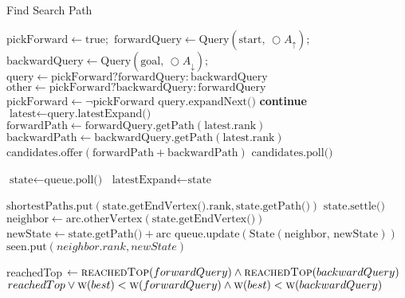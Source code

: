 \begin{algorithm}
    \caption{Find Search Path}
    \label{alg:cchSearch}
    \begin{algorithmic}[1]
        \State $\text{pickForward} \gets \text{true};$ 
        \State $\text{forwardQuery} \gets \text{Query}(\text{start, } \bigcirc A_\uparrow);$$\text{backwardQuery} \gets \text{Query}(\text{goal, } \bigcirc A_\downarrow);$
            \State $\text{query} \gets \text{pickForward} ? \text{forwardQuery} : \text{backwardQuery}$
            \State $\text{other} \gets \text{pickForward} ? \text{backwardQuery} : \text{forwardQuery}$
            \State $\text{pickForward} \gets \neg \text{pickForward}$
                 $\text{query.expandNext()}$
            \Else
                 \textbf{ continue}
            \EndIf            
            \State $\text{latest} \gets \text{query.latestExpand()}$
                \State $\text{forwardPath} \gets \text{forwardQuery.getPath}(\text{latest.rank})$
                \State $\text{backwardPath} \gets \text{backwardQuery.getPath}(\text{latest.rank})$
                \State $\text{candidates.offer}(\text{forwardPath} + \text{backwardPath})$
            \EndIf
        \EndWhile
        \State \Return $\text{candidates.poll()}$
    \EndFunction

    \State $\text{state} \gets \text{queue.poll()}$
    \State $\text{latestExpand} \gets \text{state}$
    
        \State $\text{shortestPaths.put}(\text{state.getEndVertex().rank}, \text{state.getPath()})$
    \EndIf
    \State $\text{state.settle()}$
        \State $\text{neighbor} \gets \text{arc.otherVertex}(\text{state.getEndVertex()})$
        \State $\text{newState} \gets \text{state.getPath()} + \text{arc}$
        \State $\text{queue.update}(\text{State}(\text{neighbor, newState}))$
        \State $\text{seen.put}(neighbor.rank, newState)$
            
        \EndIf
    \EndFor
    \EndProcedure
    \State reachedTop $\gets \Call{reachedTop}{forwardQuery} \land \Call{reachedTop}{backwardQuery}$ 
    \State \Return $reachedTop  \lor \Call{w}{best} < \Call{w}{forwardQuery} \land \Call{w}{best} < \Call{w}{backwardQuery}$
    \EndFunction
    \end{algorithmic}
\end{algorithm}